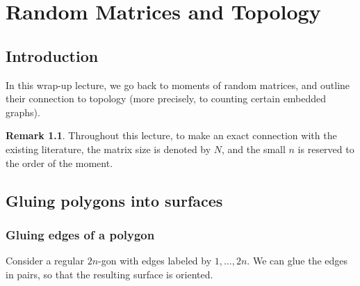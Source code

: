 \documentclass[letterpaper,11pt,oneside,reqno]{book}
\numberwithin{equation}{chapter}  %
\theoremstyle{definition}
\newtheorem{remark}[proposition]{Remark}
\begin{document}
\chapter{Random Matrices and Topology}
\label{chap:lecture15}





\section{Introduction}

In this wrap-up lecture, we go back to moments of random
matrices, and outline their connection to topology
(more precisely, to counting certain embedded graphs).

\begin{remark}
	Throughout this lecture, to make an exact connection with the existing literature,
	the matrix size is denoted by $N$, and the small $n$ is reserved to
	the order of the moment.
\end{remark}

\section{Gluing polygons into surfaces}
\label{lecture15:sec:gluing-polygons}
\subsection{Gluing edges of a polygon}

Consider a regular $2n$-gon with edges labeled by $1,\ldots,2n$.
We can glue the edges in pairs, so that the resulting
surface is oriented.
\end{document}
